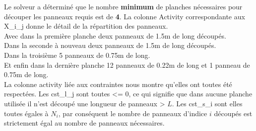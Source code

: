 \documentclass[12pt, openany]{report}
\begin{document}
Le solveur a déterminé que le nombre \textbf{minimum} de planches nécessaires pour découper les panneaux requis est de \textbf{4}. La colonne Activity correspondante aux X\_i\_j donne le détail de la répartition des panneaux. \\
Avec dans la première planche deux panneaux de 1.5m de long découpés. \\
Dans la seconde à nouveau deux panneaux de 1.5m de long découpés. \\
Dans la troisième 5 panneaux de 0.75m de long. \\
Et enfin dans la dernière planche 12 panneaux de 0.22m de long et 1 panneau de 0.75m de long. \\
La colonne activity liée aux contraintes nous montre qu'elles ont toutes été respectées. Les cst\_l\_j sont toutes <= 0, ce qui signifie que dans aucune planche utilisée il n'est découpé une longueur de panneaux > $L$. 
Les cst\_s\_i sont elles toutes égales à $N_{i}$, par conséquent le nombre de panneaux d'indice $i$ découpés est strictement égal au nombre de panneaux nécessaires.
\end{document}
